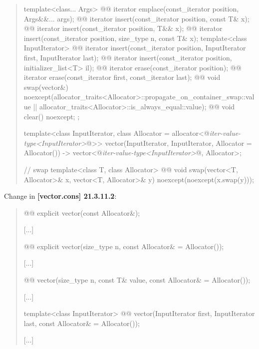 \documentclass{wg21}
\begin{document}
\begin{quote}
\begin{codeblock}
{{    template<class... Args> @@ iterator emplace(const_iterator position, Args&&... args);
    @@ iterator insert(const_iterator position, const T& x);
    @@ iterator insert(const_iterator position, T&& x);
    @@ iterator insert(const_iterator position, size_type n, const T& x);
    template<class InputIterator>
    @@ iterator insert(const_iterator position, InputIterator first, InputIterator last);
    @@ iterator insert(const_iterator position, initializer_list<T> il);
    @@ iterator erase(const_iterator position);
    @@ iterator erase(const_iterator first, const_iterator last);
    @@ void     swap(vector&)
      noexcept(allocator_traits<Allocator>::propagate_on_container_swap::value ||
               allocator_traits<Allocator>::is_always_equal::value);
    @@ void     clear() noexcept;
  };

  template<class InputIterator,
           class Allocator = allocator<@\textit{iter-value-type<InputIterator>}@>>
    vector(InputIterator, InputIterator, Allocator = Allocator())
      -> vector<@\textit{iter-value-type<InputIterator>}@, Allocator>;

  // swap
  template<class T, class Allocator>
    @@ void swap(vector<T, Allocator>& x, vector<T, Allocator>& y)
      noexcept(noexcept(x.swap(y)));
}
\end{codeblock}%
\end{quote}

Change in \textbf{[vector.cons] 21.3.11.2}:
\begin{quote}
\begin{itemdecl}
@@ explicit vector(const Allocator&);
\end{itemdecl}
[...]
\begin{itemdecl}
@@ explicit vector(size_type n, const Allocator& = Allocator());
\end{itemdecl}
[...]
\begin{itemdecl}
@@ vector(size_type n, const T& value,
                           const Allocator& = Allocator());
\end{itemdecl}
[...]
\begin{itemdecl}
template<class InputIterator>
  @@ vector(InputIterator first, InputIterator last,
                             const Allocator& = Allocator());
\end{itemdecl}
[...]
\end{quote}
\end{document}
